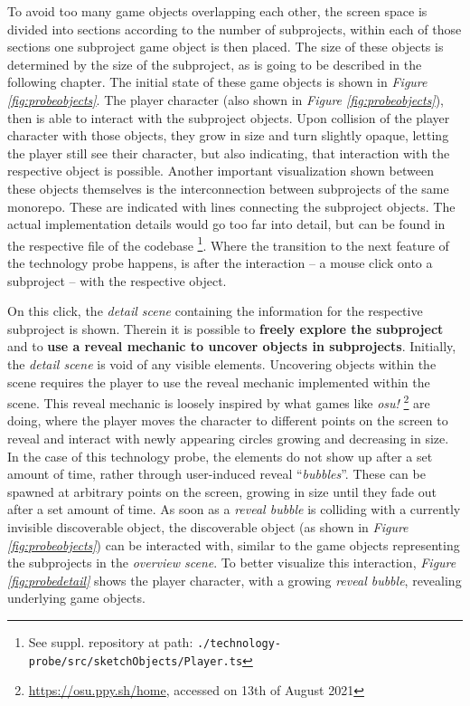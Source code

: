 To avoid too many game objects overlapping each other, the screen space is divided into sections according to the number of subprojects, within each of those sections one subproject game object is then placed. The size of these objects is determined by the size of the subproject, as is going to be described in the following chapter. The initial state of these game objects is shown in \textit{Figure \ref{fig:probeobjects}}. The player character (also shown in \textit{Figure \ref{fig:probeobjects}}), then is able to interact with the subproject objects. Upon collision of the player character with those objects, they grow in size and turn slightly opaque, letting the player still see their character, but also indicating, that interaction with the respective object is possible. Another important visualization shown between these objects themselves is the interconnection between subprojects of the same monorepo. These are indicated with lines connecting the subproject objects. The actual implementation details would go too far into detail, but can be found in the respective file of the codebase \footnote{See suppl. repository at path: \texttt{./technology-probe/src/sketchObjects/Player.ts}}. Where the transition to the next feature of the technology probe happens, is after the interaction -- a mouse click onto a subproject -- with the respective object.

On this click, the \textit{detail scene} containing the information for the respective subproject is shown. Therein it is possible to \textbf{freely explore the subproject} and to \textbf{use a reveal mechanic to uncover objects in subprojects}. Initially, the \textit{detail scene} is void of any visible elements. Uncovering objects within the scene requires the player to use the reveal mechanic implemented within the scene. This reveal mechanic is loosely inspired by what games like \textit{osu!} \footnote{\url{https://osu.ppy.sh/home}, accessed on 13th of August 2021} are doing, where the player moves the character to different points on the screen to reveal and interact with newly appearing circles growing and decreasing in size. In the case of this technology probe, the elements do not show up after a set amount of time, rather through user-induced reveal \enquote{\textit{bubbles}}. These can be spawned at arbitrary points on the screen, growing in size until they fade out after a set amount of time. As soon as a \textit{reveal bubble} is colliding with a currently invisible discoverable object, the discoverable object (as shown in \textit{Figure \ref{fig:probeobjects}}) can be interacted with, similar to the game objects representing the subprojects in the \textit{overview scene}. To better visualize this interaction, \textit{Figure \ref{fig:probedetail}} shows the player character, with a growing \textit{reveal bubble}, revealing underlying game objects.

